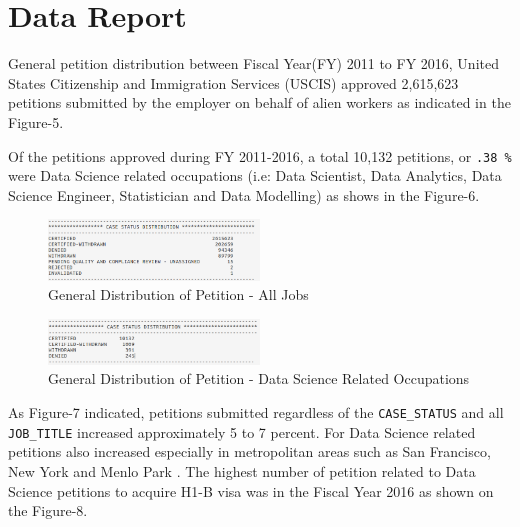 \documentclass[9pt,twocolumn,twoside]{../../styles/osajnl}
\begin{document}
\section{ Data Report}

General  petition distribution between Fiscal Year(FY) 2011 to FY 2016, United States Citizenship and Immigration Services (USCIS) approved 2,615,623 petitions submitted  by the employer on behalf of alien workers as indicated in the Figure-5.  

Of the petitions approved during FY 2011-2016, a total 10,132 petitions, or \verb|.38 %|  were  Data Science related occupations (i.e:  Data Scientist, Data Analytics, Data Science Engineer, Statistician and Data Modelling) as shows in the Figure-6. 

\begin{figure}[H]
  \centering
  \includegraphics[width=0.5\textwidth]{images/image14} 
  \caption{General Distribution of Petition  - All Jobs}
  \end{figure}

\begin{figure}[H]
  \centering
  \includegraphics[width=0.5\textwidth]{images/image17}     
  \caption{General Distribution of Petition  - Data Science Related Occupations}
  \end{figure}


As Figure-7 indicated, petitions submitted regardless of the \verb|CASE_STATUS| and all \verb|JOB_TITLE| increased approximately 5 to 7 percent. For Data Science related petitions also increased especially in metropolitan areas such as San Francisco, New York and Menlo Park . The highest number of petition related to Data Science petitions to acquire H1-B visa was in the Fiscal Year 2016 as shown on the Figure-8.
\end{document}
